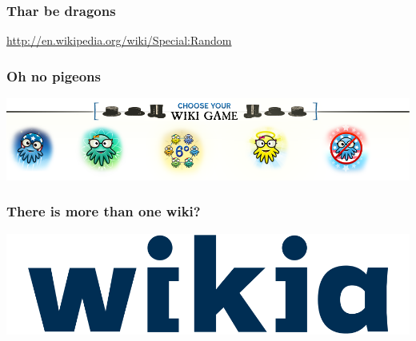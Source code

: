 \documentclass{beamer}
\begin{document}
\begin{frame}
  \frametitle{Thar be dragons}

  \url{http://en.wikipedia.org/wiki/Special:Random}
\end{frame}

\begin{frame}
  \frametitle{Oh no pigeons}
  \begin{center}
    \includegraphics[width = \textwidth, keepaspectratio = true]{figure/wiki_game}
  \end{center}
\end{frame}

\begin{frame}
  \frametitle{There is more than one wiki?}
  \begin{center}
    \includegraphics[width = \textwidth, keepaspectratio = true]{figure/wikia}
  \end{center}
\end{frame}
\end{document}
